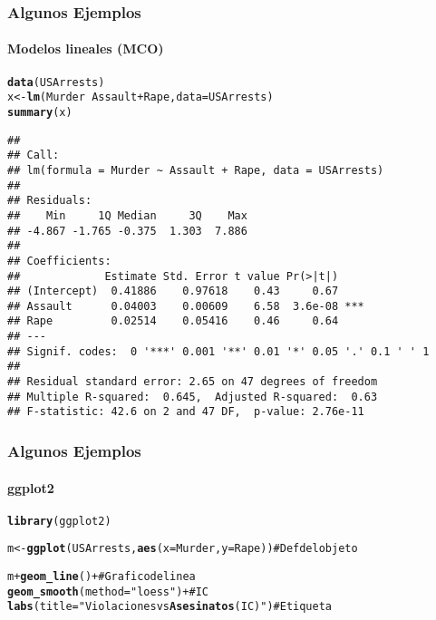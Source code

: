 \documentclass[10pt, letterpaper]{beamer}\usepackage{graphicx, color}
\makeatletter
\newcommand{\hlfunctioncall}[1]{\textcolor[rgb]{0.501960784313725,0,0.329411764705882}{\textbf{#1}}}%
\newcommand{\hlstring}[1]{\textcolor[rgb]{0.6,0.6,1}{#1}}%
\newcommand{\hlcomment}[1]{\textcolor[rgb]{0.180392156862745,0.6,0.341176470588235}{#1}}%
\newenvironment{kframe}{%
 \def\at@end@of@kframe{}%
 \ifinner\ifhmode%
  \def\at@end@of@kframe{\end{minipage}}%
  \begin{minipage}{\columnwidth}%
 \fi\fi%
 \def\FrameCommand##1{\hskip\@totalleftmargin \hskip-\fboxsep
 \colorbox{shadecolor}{##1}\hskip-\fboxsep
     \hskip-\linewidth \hskip-\@totalleftmargin \hskip\columnwidth}%
 \MakeFramed {\advance\hsize-\width
   \@totalleftmargin\z@ \linewidth\hsize
   \@setminipage}}%
 {\par\unskip\endMakeFramed%
 \at@end@of@kframe}
\newenvironment{knitrout}{}{} %
\makeatother
\begin{document}
\begin{frame}[fragile]
\frametitle{Algunos Ejemplos}
\framesubtitle{Modelos lineales (MCO)}
\begin{knitrout}\scriptsize
{}\color{fgcolor}\begin{kframe}
\begin{alltt}
\hlfunctioncall{data}(USArrests)
x <- \hlfunctioncall{lm}(Murder ~ Assault + Rape, data = USArrests)
\hlfunctioncall{summary}(x)
\end{alltt}
\begin{verbatim}
## 
## Call:
## lm(formula = Murder ~ Assault + Rape, data = USArrests)
## 
## Residuals:
##    Min     1Q Median     3Q    Max 
## -4.867 -1.765 -0.375  1.303  7.886 
## 
## Coefficients:
##             Estimate Std. Error t value Pr(>|t|)    
## (Intercept)  0.41886    0.97618    0.43     0.67    
## Assault      0.04003    0.00609    6.58  3.6e-08 ***
## Rape         0.02514    0.05416    0.46     0.64    
## ---
## Signif. codes:  0 '***' 0.001 '**' 0.01 '*' 0.05 '.' 0.1 ' ' 1
## 
## Residual standard error: 2.65 on 47 degrees of freedom
## Multiple R-squared:  0.645,	Adjusted R-squared:  0.63 
## F-statistic: 42.6 on 2 and 47 DF,  p-value: 2.76e-11
\end{verbatim}
\end{kframe}
\end{knitrout}

\end{frame}

\begin{frame}[fragile]
\frametitle{Algunos Ejemplos}
\framesubtitle{ggplot2}
\begin{knitrout}\scriptsize
{}\color{fgcolor}\begin{kframe}
\begin{alltt}
\hlfunctioncall{library}(ggplot2)
\end{alltt}


{\ttfamily\noindent\bfseries\color{errorcolor}{\#\# Error: there is no package called 'ggplot2'}}\begin{alltt}
m <- \hlfunctioncall{ggplot}(USArrests, \hlfunctioncall{aes}(x=Murder,y=Rape)) \hlcomment{# Def del objeto}
\end{alltt}


{\ttfamily\noindent\bfseries\color{errorcolor}{\#\# Error: could not find function "ggplot"}}\begin{alltt}
m + \hlfunctioncall{geom_line}() + \hlcomment{# Grafico de linea}
  \hlfunctioncall{geom_smooth}(method=\hlstring{"loess"}) + # IC
  \hlfunctioncall{labs}(title=\hlstring{"Violaciones vs \hlfunctioncall{Asesinatos} (IC)"}) # Etiqueta
\end{alltt}


{\ttfamily\noindent\bfseries\color{errorcolor}{\#\# Error: object 'm' not found}}\end{kframe}
\end{knitrout}

\end{frame}

\end{document}
